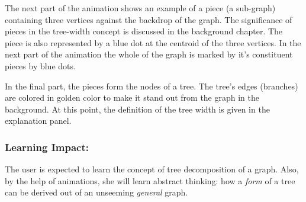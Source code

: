 The next part of the animation shows an example of a piece (a sub-graph)
containing three vertices against the backdrop of the graph. The significance
of pieces in the tree-width concept is discussed in the background chapter.
The piece is also represented by a blue dot at the centroid of the three
vertices. In the next part of the animation the whole of the graph is marked by
it's constituent pieces by blue dots. 

In the final part, the pieces form the nodes of a tree. The tree's edges
(branches) are colored in golden color to make it stand out from the graph in
the background. At this point, the definition of the tree width is given in
the explanation panel.

\subsubsection{Learning Impact:}
The user is expected to learn the concept of tree decomposition of a graph.
Also, by the help of animations, she will learn abstract thinking: how a
\emph{form} of a tree can be derived out of an unseeming \emph{general} graph.
